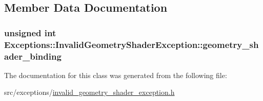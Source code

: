 \subsection{Member Data Documentation}
\hypertarget{class_exceptions_1_1_invalid_geometry_shader_exception_a9b392c914b5d558b6ef0eaf130eb7ce9}{}
\subsubsection[{geometry\+\_\+shader\+\_\+binding}]{\setlength{\rightskip}{0pt plus 5cm}unsigned int Exceptions\+::\+Invalid\+Geometry\+Shader\+Exception\+::geometry\+\_\+shader\+\_\+binding\hspace{0.3cm}{\ttfamily [private]}}\label{class_exceptions_1_1_invalid_geometry_shader_exception_a9b392c914b5d558b6ef0eaf130eb7ce9}


The documentation for this class was generated from the following file\+:\begin{DoxyCompactItemize}
\item 
src/exceptions/\hyperlink{invalid__geometry__shader__exception_8h}{invalid\+\_\+geometry\+\_\+shader\+\_\+exception.\+h}\end{DoxyCompactItemize}
